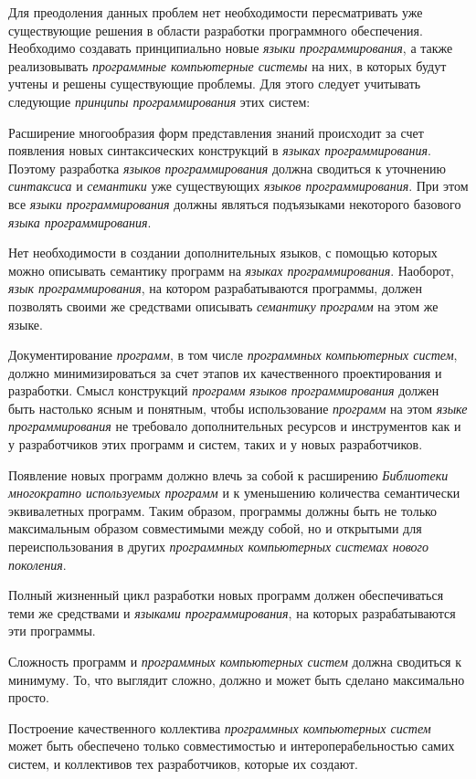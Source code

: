 Для преодоления данных проблем нет необходимости пересматривать уже существующие решения в области разработки программного обеспечения. Необходимо создавать принципиально новые \textit{языки программирования}, а также реализовывать \textit{программные компьютерные системы} на них, в которых будут учтены и решены существующие проблемы. Для этого следует учитывать следующие \textit{принципы программирования} этих систем:
\begin{textitemize}
	\item Расширение многообразия форм представления знаний происходит за счет появления новых синтаксических конструкций в \textit{языках программирования}. Поэтому разработка \textit{языков программирования} должна сводиться к уточнению \textit{синтаксиса} и \textit{семантики} уже существующих \textit{языков программирования}. При этом все \textit{языки программирования} должны являться подъязыками некоторого базового \textit{языка программирования}.
	\item Нет необходимости в создании дополнительных языков, с помощью которых можно описывать семантику программ на \textit{языках программирования}. Наоборот, \textit{язык программирования}, на котором разрабатываются программы, должен позволять своими же средствами описывать \textit{семантику} \textit{программ} на этом же языке.
	\item Документирование \textit{программ}, в том числе \textit{программных компьютерных систем}, должно минимизироваться за счет этапов их качественного проектирования и разработки. Смысл конструкций \textit{программ} \textit{языков программирования} должен быть настолько ясным и понятным, чтобы использование \textit{программ} на этом \textit{языке программирования} не требовало дополнительных ресурсов и инструментов как и у разработчиков этих программ и систем, таких и у новых разработчиков.
	\item Появление новых программ должно влечь за собой к расширению \textit{Библиотеки многократно используемых программ} и к уменьшению количества семантически эквивалетных программ. Таким образом, программы должны быть не только максимальным образом совместимыми между собой, но и открытыми для переиспользования в других \textit{программных компьютерных системах нового поколения}.
	\item Полный жизненный цикл разработки новых программ должен обеспечиваться теми же средствами и \textit{языками программирования}, на которых разрабатываются эти программы.
	\item Сложность программ и \textit{программных компьютерных систем} должна сводиться к минимуму. То, что выглядит сложно, должно и может быть сделано максимально просто. 
	\item Построение качественного коллектива \textit{программных компьютерных систем} может быть обеспечено только совместимостью и интероперабельностью самих систем, и коллективов тех разработчиков, которые их создают.
\end{textitemize}


